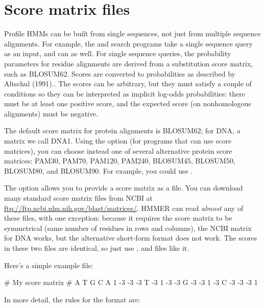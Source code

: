 \newpage
\section{Score matrix files}

Profile HMMs can be built from single sequences, not just from
multiple sequence alignments. For example, the  and
 search programs take a single sequence query as an
input, and  can as well. For single sequence queries, the
probability parameters for residue alignments are derived from a
substitution score matrix, such as BLOSUM62. Scores are converted to
probabilities as described by Altschul (1991).\cite{Altschul91}. The
scores can be arbitrary, but they must satisfy a couple of conditions
so they can be interpreted as implicit log-odds probabilities: there
must be at least one positive score, and the expected score (on
nonhomologous alignments) must be negative.

The default score matrix for protein alignments is BLOSUM62; for DNA,
a matrix we call DNA1. Using the  option (for programs that
can use score matrices), you can choose instead one of several
alternative protein score matrices: PAM30, PAM70, PAM120, PAM240,
BLOSUM45, BLOSUM50, BLOSUM80, and BLOSUM90. For example, you could use
.

The  option allows you to provide a score matrix as a
file. You can download many standard score matrix files from NCBI at
\url{ftp://ftp.ncbi.nlm.nih.gov/blast/matrices/}. HMMER can read
\emph{almost} any of these files, with one exception: because it
requires the score matrix to be symmetrical (same number of residues
in rows and columns), the NCBI  matrix for DNA works,
but the alternative short-form format  does not
work. The scores in these two files are identical, so just use
, and files like it.

Here's a simple example file:

\begin{sreoutput}
# My score matrix
#
   A  T  G  C
A  1 -3 -3 -3
T -3  1 -3 -3
G -3 -3  1 -3
C -3 -3 -3  1
\end{sreoutput}

In more detail, the rules for the format are:


